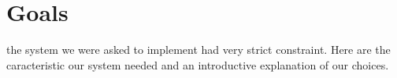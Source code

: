\newpage\cleardoublepage{}
\section{Goals}
the system we were asked to implement had very strict constraint. Here are the caracteristic our system needed and an introductive explanation of our choices.